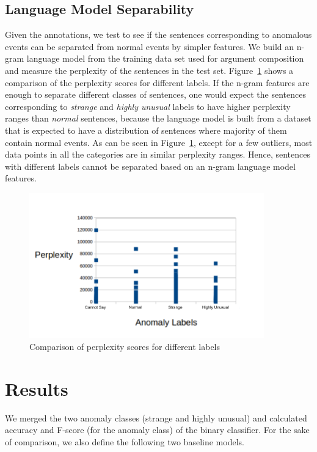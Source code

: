 \subsection{Language Model Separability}
Given the annotations, we test to see if the
sentences corresponding to anomalous events can be separated from normal events 
by simpler 
features.  We build an n-gram language model from the training data set used for 
argument composition and 
measure the perplexity of the sentences in the test set.  
Figure~\ref{fig:nem_lm_ppl} shows
a comparison of the perplexity scores for different labels. If the n-gram 
features are enough 
to separate different classes of sentences, one would expect the sentences 
corresponding to 
\textit{strange} and \textit{highly unusual} labels to have higher perplexity 
ranges than \textit{normal}
sentences, because the language model is built from a dataset that is expected 
to have a distribution of
sentences where majority of them contain normal events.  As can be seen in 
Figure~\ref{fig:nem_lm_ppl}, 
except for a few outliers, most data points in all the categories are in similar 
perplexity ranges.
Hence, sentences with different labels cannot be separated based on an n-gram 
language model features.

\begin{figure}
  \begin{center}
  \includegraphics[width=4in]{figures/perplexity-comparison.png}
  \caption{Comparison of perplexity scores for different labels}
  \label{fig:nem_lm_ppl}
  \end{center}
\end{figure}

\section{Results}
We merged the two anomaly classes (strange and highly unusual) and calculated accuracy and F-score (for the anomaly class) of the binary
classifier. For the sake of comparison, we also define the following two baseline models.

